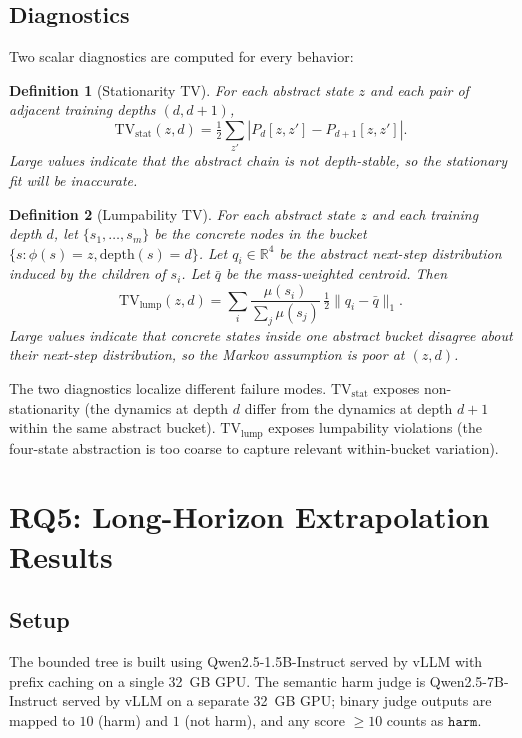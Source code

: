 \documentclass[11pt]{article}
\newtheorem{definition}{Definition}
\newcommand{\harm}{\texttt{harm}}
\newcommand{\TV}{\mathrm{TV}}
\begin{document}
\subsection{Diagnostics}

Two scalar diagnostics are computed for every behavior:

\begin{definition}[Stationarity TV]
For each abstract state $z$ and each pair of adjacent training depths $(d, d+1)$,
\[
  \TV_\mathrm{stat}(z, d) = \tfrac{1}{2}\sum_{z'} \left| P_d[z, z'] - P_{d+1}[z, z'] \right|.
\]
Large values indicate that the abstract chain is not depth-stable, so the stationary fit will be inaccurate.
\end{definition}

\begin{definition}[Lumpability TV]
For each abstract state $z$ and each training depth $d$, let $\{s_1, \ldots, s_m\}$ be the concrete nodes in the bucket $\{s : \phi(s) = z, \mathrm{depth}(s) = d\}$.  Let $q_i \in \mathbb{R}^4$ be the abstract next-step distribution induced by the children of $s_i$.  Let $\bar q$ be the mass-weighted centroid.  Then
\[
  \TV_\mathrm{lump}(z, d) = \sum_i \frac{\mu(s_i)}{\sum_j \mu(s_j)}\, \tfrac{1}{2} \|q_i - \bar q\|_1.
\]
Large values indicate that concrete states inside one abstract bucket disagree about their next-step distribution, so the Markov assumption is poor at $(z, d)$.
\end{definition}

The two diagnostics localize different failure modes.  $\TV_\mathrm{stat}$ exposes non-stationarity (the dynamics at depth $d$ differ from the dynamics at depth $d+1$ within the same abstract bucket).  $\TV_\mathrm{lump}$ exposes lumpability violations (the four-state abstraction is too coarse to capture relevant within-bucket variation).

\section{RQ5: Long-Horizon Extrapolation Results}
\label{sec:abstract-results}

\subsection{Setup}

The bounded tree is built using Qwen2.5-1.5B-Instruct served by vLLM with prefix caching on a single 32~GB GPU.  The semantic harm judge is Qwen2.5-7B-Instruct served by vLLM on a separate 32~GB GPU; binary judge outputs are mapped to $10$ (harm) and $1$ (not harm), and any score $\geq 10$ counts as $\harm$.
\end{document}
